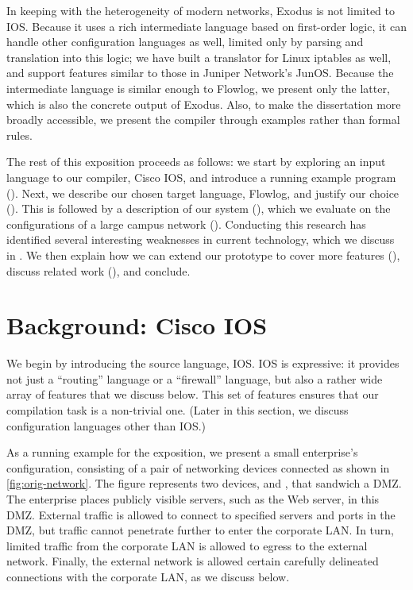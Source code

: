 In keeping with the heterogeneity of modern networks,
Exodus is not limited to IOS. Because it uses a rich intermediate
language based on first-order logic, it can handle other configuration
languages as well, limited only by parsing and translation into this
logic; we have built a translator for Linux iptables as well, and
support features similar to those in Juniper Network's JunOS. Because
the intermediate language is similar enough to Flowlog, we present
only the latter, which is also the concrete output of Exodus. Also, to
make the dissertation more broadly accessible, we present the compiler
through examples rather than formal rules.

The rest of this exposition proceeds as follows: we start by exploring an
input language to our compiler, Cisco IOS, and introduce a running
example program ().  Next, we describe our chosen
target language, Flowlog, and justify our choice
(). This is followed by a description
of our system (), which we
evaluate on the configurations of a large campus network
().  Conducting this research has identified
several interesting weaknesses in current technology, which we discuss
in . We then explain how we can extend our
prototype to cover more features (), discuss
related work (), and conclude.

\section{Background: Cisco IOS}
\label{s:bg:ios}

We begin by introducing the source language, IOS. IOS is expressive:
it provides not just a ``routing'' language or a ``firewall'' language, but
also a rather wide array of features that we discuss
below. This set of features ensures that our compilation
task is a non-trivial one. (Later in this section, 
we discuss configuration languages other than IOS.)

As a running example for the exposition, we present a small enterprise's
configuration, consisting of a pair of networking devices connected as
shown in \autoref{fig:orig-network}. The figure represents two
devices,  and , that sandwich a DMZ. The enterprise
places publicly visible servers, such as the Web server, in this
DMZ. External traffic is allowed to connect to specified servers and
ports in the DMZ, but traffic cannot penetrate further to enter the
corporate LAN. In turn, limited traffic from the corporate LAN is
allowed to egress to the external network. Finally, the external
network is allowed certain carefully delineated
connections with the corporate LAN, as we discuss below.

